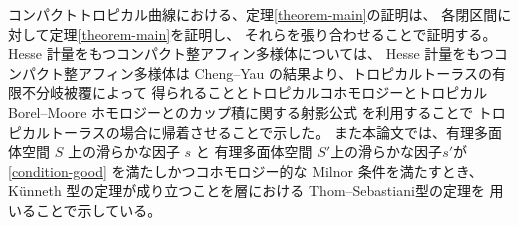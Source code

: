 \documentclass[uplatex,dvipdfmx,12pt]{jsarticle}
\numberwithin{equation}{section}
\theoremstyle{definition}
\newcommand{\aftersection}{\vspace{-10pt}}
\begin{document}
コンパクトトロピカル曲線における、定理\ref{theorem-main}の証明は、
各閉区間に対して定理\ref{theorem-main}を証明し、
それらを張り合わせることで証明する。
Hesse 計量をもつコンパクト整アフィン多様体については、
Hesse 計量をもつコンパクト整アフィン多様体は Cheng--Yau
の結果\cite{MR714338}より、トロピカルトーラスの有限不分岐被覆によって
得られることとトロピカルコホモロジーとトロピカル Borel--Moore
ホモロジーとのカップ積に関する射影公式
\cite{gross2019sheaftheoretic}を利用することで
トロピカルトーラスの場合に帰着させることで示した。
また本論文では、有理多面体空間 $S$ 上の滑らかな因子 $s$ と
有理多面体空間 $S'$上の滑らかな因子$s'$が\cref{condition-good}
を満たしかつコホモロジー的な Milnor 条件を満たすとき、
K\"unneth 型の定理が成り立つことを層における
Thom--Sebastiani型の定理\cite{MR2031639}を
用いることで示している。

\aftersection

{\small


}
\end{document}
